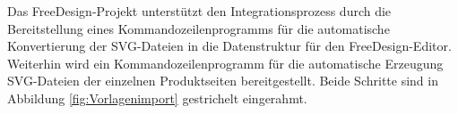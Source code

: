 Das FreeDesign-Projekt unterstützt den Integrationsprozess durch die Bereitstellung eines Kommandozeilenprogramms für die automatische Konvertierung der SVG-Dateien in die Datenstruktur für den FreeDesign-Editor. Weiterhin wird ein Kommandozeilenprogramm für die automatische Erzeugung SVG-Dateien der einzelnen Produktseiten bereitgestellt. Beide Schritte sind in Abbildung \ref{fig:Vorlagenimport} gestrichelt eingerahmt. 